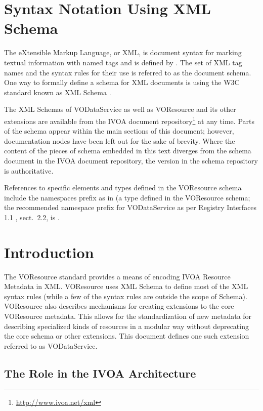 \documentclass[11pt,a4paper]{ivoa}
\begin{document}
\section*{Syntax Notation Using XML Schema}

The eXtensible Markup Language, or XML, is document syntax for marking
textual information with named tags and is defined by \citet{std:XML}.
The set of XML tag names and the syntax
rules for their use is referred to as the document schema.  One way to
formally define a schema for XML documents is using the W3C standard
known as XML Schema \citep{std:XSD}.

The XML Schemas of VODataService as well as VOResource and its other
extensions are
available from the IVOA document
repository\footnote{\url{http://www.ivoa.net/xml}} at any time.
Parts of the schema appear within the main sections of this document;
however, documentation nodes have been left out for the sake of brevity.
Where the content of the pieces of schema embedded in this text
diverges from the schema document in the IVOA document
repository, the version in the schema repository is authoritative.

References to specific elements and types defined in the VOResource
schema include the namespaces prefix  as in
 (a type defined in the VOResource schema; the
recommended namespace prefix for VODataService as per Registry
Interfaces 1.1 \citep{todo:RI1.1}, sect.~2.2, is .

\section{Introduction}

The VOResource standard \citep{todo:VOR1.1} provides a means of
encoding IVOA Resource Metadata in XML.
VOResource uses XML Schema \citep{std:XSD} to define
most of the XML syntax rules (while a few of the syntax rules are
outside the scope of Schema).  VOResource also describes mechanisms
for creating extensions to the core VOResource metadata.  This allows
for the standardization of new metadata for describing specialized
kinds of resources in a modular way without deprecating the core
schema or other extensions.  This document defines one such extension
referred to as VODataService.

\subsection{The Role in the IVOA Architecture}
\end{document}
